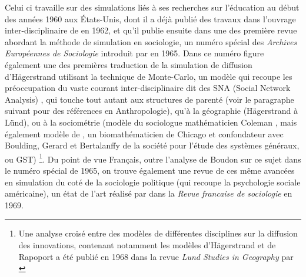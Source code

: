 Celui ci travaille sur des simulations liés à ses recherches sur l'éducation au début des années 1960 aux États-Unis, dont il a déjà publié des travaux dans l'ouvrage inter-disciplinaire de \textcite{Guetzkow1962} en 1962, et qu'il publie ensuite \autocite{Coleman1965} dans une des première revue abordant la méthode de simulation en sociologie, un numéro spécial des \textit{Archives Européennes de Sociologie} introduit par \textcite{Boudon1965} en 1965. Dans ce  numéro figure également une des premières traduction de la simulation de diffusion d'Hägerstrand \autocite{Hagerstrand1965} utilisant la technique de Monte-Carlo, un modèle qui recoupe les préoccupation du vaste courant inter-disciplinaire dit des SNA (Social Network Analysis) \autocite{Bernard2005}, qui touche tout autant aux structures de parenté (voir le paragraphe suivant pour des références en Anthropologie), qu'à la géographie (Hägerstrand à Lünd), ou à la sociométrie (modèle du sociologue mathématicien  Coleman \textcite{Coleman1957}, mais également modèle de \textcite{Rapoport1961}, un biomathématicien de Chicago et confondateur avec Boulding, Gerard et Bertalanffy de la société pour l'étude des systèmes généraux, ou GST) \footnote{Une analyse croisé entre des modèles de différentes disciplines sur la diffusion des innovations, contenant notamment les modèles d'Hägerstrand et de Rapoport a été publié en 1968 dans la revue \textit{Lund Studies in Geography} par \textcite{Brown1968}}. Du point de vue Français, outre l'analyse de Boudon sur ce sujet dans le numéro spécial de 1965, on trouve également une revue de ces même avancées en simulation  du coté de la sociologie politique (qui recoupe la psychologie sociale américaine), un état de l'art réalisé par \textcite{Padioleau1969} dans la \textit{Revue francaise de sociologie} en 1969.


